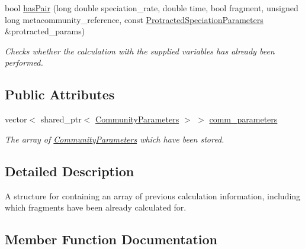 \begin{DoxyCompactItemize}
bool \hyperlink{struct_communities_array_a0bd0be60b599588b3855f4872b63a3de}{has\+Pair} (long double speciation\+\_\+rate, double time, bool fragment, unsigned long metacommunity\+\_\+reference, const \hyperlink{struct_protracted_speciation_parameters}{Protracted\+Speciation\+Parameters} \&protracted\+\_\+params)
\begin{DoxyCompactList}\small\item\em Checks whether the calculation with the supplied variables has already been performed. \end{DoxyCompactList}\end{DoxyCompactItemize}
\subsection*{Public Attributes}
\begin{DoxyCompactItemize}
\item 
vector$<$ shared\+\_\+ptr$<$ \hyperlink{struct_community_parameters}{Community\+Parameters} $>$ $>$ \hyperlink{struct_communities_array_a8b3fb7b85b0c86030fd39f2fa34cfe97}{comm\+\_\+parameters}\hypertarget{struct_communities_array_a8b3fb7b85b0c86030fd39f2fa34cfe97}{}\label{struct_communities_array_a8b3fb7b85b0c86030fd39f2fa34cfe97}

\begin{DoxyCompactList}\small\item\em The array of \hyperlink{struct_community_parameters}{Community\+Parameters} which have been stored. \end{DoxyCompactList}\end{DoxyCompactItemize}


\subsection{Detailed Description}
A structure for containing an array of previous calculation information, including which fragments have been already calculated for. 

\subsection{Member Function Documentation}
